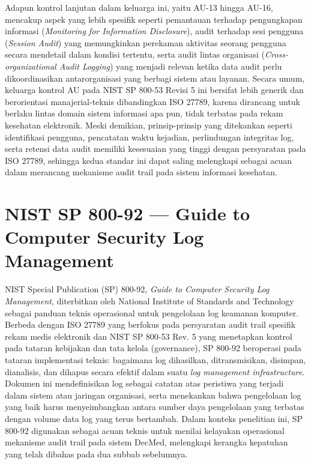 Adapun kontrol lanjutan dalam keluarga ini, yaitu AU-13 hingga AU-16, mencakup aspek yang lebih spesifik seperti pemantauan terhadap pengungkapan informasi (\textit{Monitoring for Information Disclosure}), audit terhadap sesi pengguna (\textit{Session Audit}) yang memungkinkan perekaman aktivitas seorang pengguna secara mendetail dalam kondisi tertentu, serta audit lintas organisasi (\textit{Cross-organizational Audit Logging}) yang menjadi relevan ketika data audit perlu dikoordinasikan antarorganisasi yang berbagi sistem atau layanan. Secara umum, keluarga kontrol AU pada NIST SP 800-53 Revisi 5 ini bersifat lebih generik dan berorientasi manajerial-teknis dibandingkan ISO 27789, karena dirancang untuk berlaku lintas domain sistem informasi apa pun, tidak terbatas pada rekam kesehatan elektronik. Meski demikian, prinsip-prinsip yang ditekankan seperti identifikasi pengguna, pencatatan waktu kejadian, perlindungan integritas log, serta retensi data audit memiliki kesesuaian yang tinggi dengan persyaratan pada ISO 27789, sehingga kedua standar ini dapat saling melengkapi sebagai acuan dalam merancang mekanisme audit trail pada sistem informasi kesehatan.

\section{NIST SP 800-92 --- Guide to Computer Security Log Management}

NIST Special Publication (SP) 800-92, \textit{Guide to Computer Security Log Management}, diterbitkan oleh National Institute of Standards and Technology sebagai panduan teknis operasional untuk pengelolaan log keamanan komputer. Berbeda dengan ISO 27789 yang berfokus pada persyaratan audit trail spesifik rekam medis elektronik dan NIST SP 800-53 Rev. 5 yang menetapkan kontrol pada tataran kebijakan dan tata kelola (governance), SP 800-92 beroperasi pada tataran implementasi teknis: bagaimana log dihasilkan, ditransmisikan, disimpan, dianalisis, dan dihapus secara efektif dalam suatu \textit{log management infrastructure}. Dokumen ini mendefinisikan log sebagai catatan atas peristiwa yang terjadi dalam sistem atau jaringan organisasi, serta menekankan bahwa pengelolaan log yang baik harus menyeimbangkan antara sumber daya pengelolaan yang terbatas dengan volume data log yang terus bertambah. Dalam konteks penelitian ini, SP 800-92 digunakan sebagai acuan teknis untuk menilai kelayakan operasional mekanisme audit trail pada sistem DecMed, melengkapi kerangka kepatuhan yang telah dibahas pada dua subbab sebelumnya.

